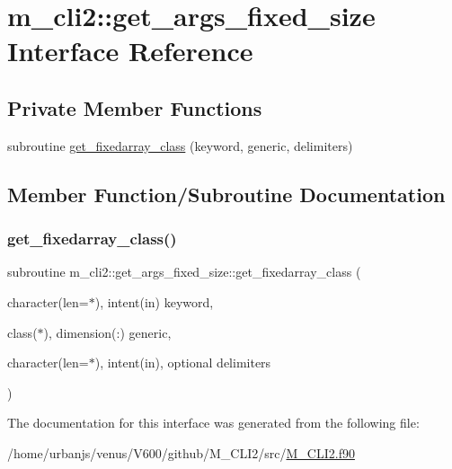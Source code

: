 \hypertarget{interfacem__cli2_1_1get__args__fixed__size}{}\section{m\+\_\+cli2\+:\+:get\+\_\+args\+\_\+fixed\+\_\+size Interface Reference}
\label{interfacem__cli2_1_1get__args__fixed__size}
\subsection*{Private Member Functions}
\begin{DoxyCompactItemize}
\item 
subroutine \mbox{\hyperlink{interfacem__cli2_1_1get__args__fixed__size_a93e683afd3e70009ae1a584df4268c3f}{get\+\_\+fixedarray\+\_\+class}} (keyword, generic, delimiters)
\end{DoxyCompactItemize}


\subsection{Member Function/\+Subroutine Documentation}
\mbox{\label{interfacem__cli2_1_1get__args__fixed__size_a93e683afd3e70009ae1a584df4268c3f}} 
\subsubsection{\texorpdfstring{get\+\_\+fixedarray\+\_\+class()}{get\_fixedarray\_class()}}
{\footnotesize\ttfamily subroutine m\+\_\+cli2\+::get\+\_\+args\+\_\+fixed\+\_\+size\+::get\+\_\+fixedarray\+\_\+class (\begin{DoxyParamCaption}\item[{character(len=$\ast$), intent(in)}]{keyword,  }\item[{class($\ast$), dimension(\+:)}]{generic,  }\item[{character(len=$\ast$), intent(in), optional}]{delimiters }\end{DoxyParamCaption})\hspace{0.3cm}{\ttfamily [private]}}



The documentation for this interface was generated from the following file\+:\begin{DoxyCompactItemize}
\item 
/home/urbanjs/venus/\+V600/github/\+M\+\_\+\+C\+L\+I2/src/\mbox{\hyperlink{M__CLI2_8f90}{M\+\_\+\+C\+L\+I2.\+f90}}\end{DoxyCompactItemize}

